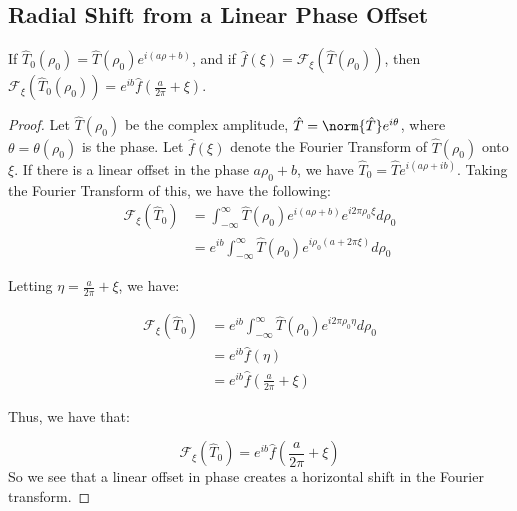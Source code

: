 \documentclass[crop=false,class=book,oneside]{standalone}
\begin{document}
        \subsection{Radial Shift from a Linear Phase Offset}
            \begin{theorem}
                If $\hat{T}_0(\rho_0)=\hat{T}(\rho_0)e^{i(a\rho+b)}$,
                and if $\hat{f}(\xi)=\mathcal{F}_{\xi}(\hat{T}(\rho_0))$,
                then $\mathcal{F}_{\xi}(\hat{T}_{0}(\rho_0))=e^{ib}\hat{f}(\frac{a}{2\pi}+\xi)$.
            \end{theorem}
            \begin{proof}
                Let $\hat{T}(\rho_0)$ be the complex amplitude,
                $\hat{T}=\norm{\hat{T}}e^{i\theta}$, where
                $\theta=\theta(\rho_0)$ is the phase. Let
                $\hat{f}(\xi)$ denote the Fourier Transform
                of $\hat{T}(\rho_0)$ onto $\xi$. If there is a
                linear offset in the phase $a\rho_0+b$, we have
                $\hat{T}_{0}=\hat{T}e^{i(a\rho+ib)}$. Taking the
                Fourier Transform of this, we have the following:
            \begin{align*}
                \mathcal{F}_{\xi}(\hat{T}_{0})
                &=\int_{-\infty}^{\infty}\hat{T}(\rho_0)
                e^{i(a\rho+b)}e^{i2\pi \rho_0 \xi}d\rho_0\\
            &=e^{ib} \int_{-\infty}^{\infty} \hat{T}(\rho_0)e^{i\rho_0(a+2\pi \xi)}d\rho_0
            \end{align*}
            
            Letting $\eta = \frac{a}{2\pi}+\xi$, we have:
            
            \begin{align*}
            \nonumber \mathcal{F}_{\xi} (\hat{T}_{0}) &= e^{ib}\int_{-\infty}^{\infty}\hat{T}(\rho_0)e^{i2\pi\rho_{0}\eta}d\rho_0 \\
            \nonumber &= e^{ib}\hat{f}(\eta)\\
            		 &= e^{ib}\hat{f}(\frac{a}{2\pi}+\xi)
            \end{align*}
            
            Thus, we have that:
            
            \begin{equation*}
            \mathcal{F}_{\xi} (\hat{T}_{0}) = e^{ib}\hat{f}(\frac{a}{2\pi}+\xi)
            \end{equation*}
            So we see that a linear offset in phase creates a horizontal shift in the Fourier transform.
            \end{proof}
            
\end{document}
